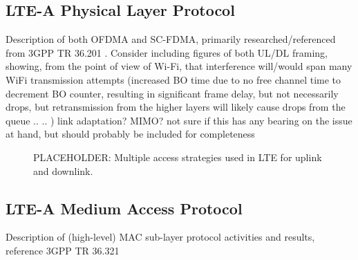 \subsection{LTE-A Physical Layer Protocol}
\label{lte-phy}
Description of both OFDMA and SC-FDMA, primarily researched/referenced from 3GPP TR 36.201 \cite{tr36201}. Consider including figures of both UL/DL framing, showing, from the point of view of Wi-Fi, that interference will/would span many WiFi transmission attempts (increased BO time due to no free channel time to decrement BO counter, resulting in significant frame delay, but not necessarily drops, but retransmission from the higher layers will likely cause drops from the queue .. ..  )  link adaptation? MIMO? not sure if this has any bearing on the issue at hand, but should probably be included for completeness
\begin{figure}[!ht] 
	\centering
	\hfil
	\caption{PLACEHOLDER: Multiple access strategies used in LTE for uplink and downlink.}
	\label{fig:ofdma_sc-fdma_comp}
\end{figure}


\subsection{LTE-A Medium Access Protocol}
\label{lte-mac}
Description of (high-level) MAC sub-layer protocol activities and results, reference 3GPP TR 36.321 \cite{tr36321}


